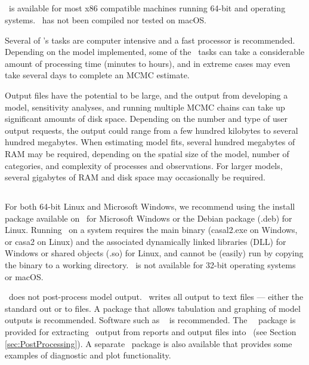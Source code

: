 \subsection{}

\CNAME\ is available for most x86 compatible machines running 64-bit  and  operating systems. \CNAME\ has not been compiled nor tested on macOS.

Several of \CNAME's tasks are computer intensive and a fast processor is recommended. Depending on the model implemented, some of the \CNAME\ tasks can take a considerable amount of processing time (minutes to hours), and in extreme cases may even take several days to complete an MCMC estimate.

Output files have the potential to be large, and the output from developing a model, sensitivity analyses, and running multiple MCMC chains can take up significant amounts of disk space. Depending on the number and type of user output requests, the output could range from a few hundred kilobytes to several hundred megabytes. When estimating model fits, several hundred megabytes of RAM may be required, depending on the spatial size of the model, number of categories, and complexity of processes and observations. For larger models, several gigabytes of RAM and disk space may occasionally be required.

\subsection{}

For both 64-bit Linux and Microsoft Windows, we recommend using the install package available on \github\ for Microsoft Windows or the Debian package (.deb) for Linux. Running \CNAME\ on a system requires the main binary (casal2.exe on Windows, or casa2 on Linux) and the associated dynamically linked libraries (DLL) for Windows or shared objects (.so) for Linux, and cannot be (easily) run by copying the binary to a working directory. \CNAME\ is not available for 32-bit operating systems or macOS.

\CNAME\ does not post-process model output. \CNAME\ writes all output to text files --- either the standard out or to files. A package that allows tabulation and graphing of model outputs is recommended. Software such as \href{http://www.r-project.org}{\R}\ \citep{R} is recommended. The \CNAME\ \R\ package is provided for extracting \CNAME\ output from reports and output files into \R\ (see Section \ref{sec:PostProcessing}). A separate \R\ package is also available that provides some examples of diagnostic and plot functionality.

